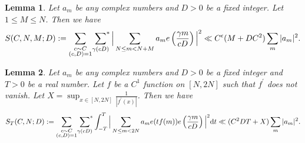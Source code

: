 \documentclass[10pt,a4paper]{amsart}
\newtheorem{lemma}{Lemma}
\newcommand{\sumstar}{\sideset{}{^*}\sum}
\begin{document}
\begin{lemma}\label{large sieve with level}
    Let $a_m$ be any complex numbers and $D>0$ be a fixed  integer. Let $1 \leq M\leq N$. Then  we have 
    \begin{align}\label{small N}
   S(C,N,M;D):= \mathop{\sum_{\substack{c \sim C \\ (c,D)=1}}}\sumstar_{\gamma (cD)}  \Big|\sum_{N \leq m < N+M} a_m  e\left( \frac{\gamma m}{cD} \right) \Big| ^2  \ll  C^\epsilon(M +  DC^2) \sum_m|a_m|^2.
\end{align}
\end{lemma}

\begin{lemma}\label{hybrid large-sieve with level}
    Let $a_m$ be  any complex numbers  and $D>0$ be a fixed  integer and $T >0 $ be a real number. Let $f$ be a $C^1$ function on $[N,2N]$ such that $f^\prime$ does not vanish. Let  $X=\sup_{x \in [N,2N]} \frac{1}{|f^\prime(x)|}$. Then we have  
    \begin{align*}
   S_T(C,N;D):=\mathop{\sum_{\substack{c \sim C \\ (c,D)=1}}}\sumstar_{\gamma (cD)} \int_{-T}^{T} \Big|\sum_{N \leq m <  2N} a_m  e(tf(m)) e\left( \frac{\gamma m}{cD} \right) \Big| ^2\mathrm{d}t  \ll  (C^2DT+X) \sum_m|a_m|^2.
\end{align*}
\end{lemma}
\end{document}
